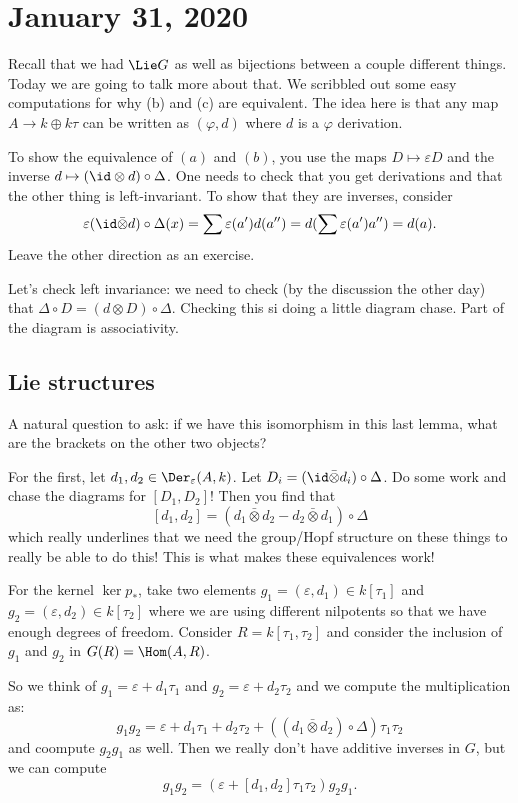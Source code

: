 \documentclass[12pt]{article}
\begin{document}
\section{January 31, 2020}
Recall that we had $\Lie G$ as well as bijections between a couple different things.
Today we are going to talk more about that. We scribbled out some easy computations for why (b) and (c) are equivalent.
The idea here is that any map $A\to k\oplus k\tau$ can be written as $(\varphi,d)$ where $d$ is a $\varphi$ derivation.

To show the equivalence of $(a)$ and $(b)$, you use the maps $D\mapsto \varepsilon D$ and the inverse $d\mapsto (\id\otimes d)\circ\Delta$. One needs to check that you get derivations and that the other thing 
is left-invariant. To show that they are inverses, consider 
\[\varepsilon(\id\bar\otimes d)\circ \Delta(x)=\sum\varepsilon(a')d(a'')=d(\sum \varepsilon(a')a'')=d(a).\]
Leave the other direction as an exercise. 

Let's check left invariance: we need to check (by the discussion the other day) that $\Delta\circ D=(d\otimes D)\circ\Delta.$ Checking this si doing a little diagram chase.
Part of the diagram is associativity.

\subsection{Lie structures}
A natural question to ask: if we have this isomorphism in this last lemma, what are the brackets on the other two objects?

For the first, let $d_1,d_2\in\Der_\varepsilon(A,k)$. Let $D_i=(\id\bar\otimes d_i)\circ\Delta$. Do some work and chase the diagrams for $[D_1,D_2]$!
Then you find that 
\[[d_1,d_2]=(d_1\bar\otimes d_2-d_2\bar\otimes d_1)\circ\Delta\]
which really underlines that we need the group/Hopf structure on these things to really be able to do this! This is what makes these equivalences work!

For the kernel $\ker p_\ast$, take two elements $g_1=(\varepsilon, d_1)\in k[\tau_1]$ and $g_2=(\varepsilon, d_2)\in k[\tau_2]$ where we 
are using different nilpotents so that we have enough degrees of freedom. Consider $R=k[\tau_1,\tau_2]$ and consider the inclusion of $g_1$ and $g_2$ in $G(R)=\Hom(A,R)$.

So we think of $g_1=\varepsilon+d_1\tau_1$ and $g_2=\varepsilon+d_2\tau_2$ and we compute the multiplication as:
\[g_1g_2=\varepsilon+d_1\tau_1+d_2\tau_2+((d_1\bar\otimes d_2)\circ\Delta)\tau_1\tau_2\]
and coompute $g_2g_1$ as well. Then we really don't have additive inverses in $G$, but we can compute 
\[g_1g_2=(\varepsilon+[d_1,d_2]\tau_1\tau_2)g_2g_1.\]
\end{document}
